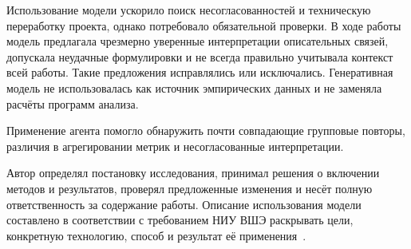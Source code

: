 Использование модели ускорило поиск несогласованностей и техническую переработку проекта, однако потребовало обязательной проверки. В ходе работы модель предлагала чрезмерно уверенные интерпретации описательных связей, допускала неудачные формулировки и не всегда правильно учитывала контекст всей работы. Такие предложения исправлялись или исключались. Генеративная модель не использовалась как источник эмпирических данных и не заменяла расчёты программ анализа.

Применение агента помогло обнаружить почти совпадающие групповые повторы, различия в агрегировании метрик и несогласованные интерпретации. 

Автор определял постановку исследования, принимал решения о включении методов и результатов, проверял предложенные изменения и несёт полную ответственность за содержание работы. Описание использования модели составлено в соответствии с требованием НИУ ВШЭ раскрывать цели, конкретную технологию, способ и результат её применения~\cite{hse-ai-guidelines}.
